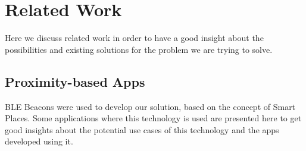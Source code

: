 \section{Related Work}
\label{sec:background_related_work}
Here we discuss related work in order to have a good insight about the possibilities and existing solutions for the problem we are trying to solve.

\subsection{Proximity-based Apps}
\label{sub:background_ble_beacons_applications}
\gls{BLE} Beacons were
used to develop our solution, based on the concept of Smart Places.
Some applications where this technology is used
are presented here to
get good insights about the potential use cases of this
technology and the apps developed using it.
